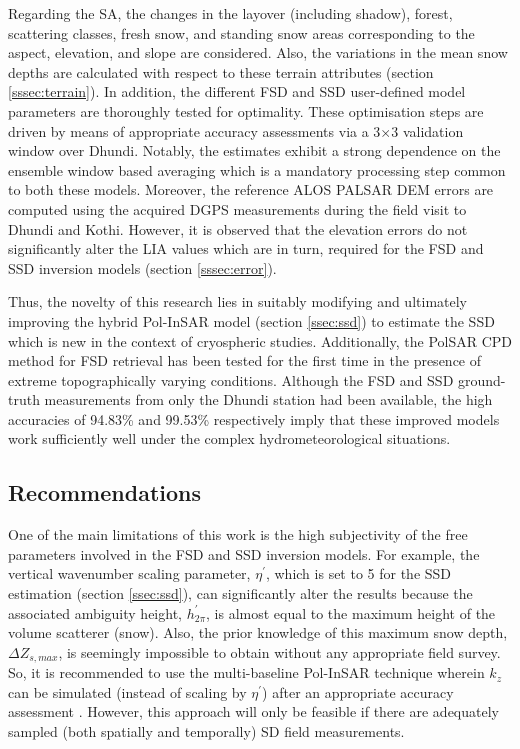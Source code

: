 \documentclass[review]{elsarticle}
\numberwithin{equation}{section}
\numberwithin{figure}{section}
\numberwithin{table}{section}
\begin{document}
Regarding the SA, the changes in the layover (including shadow), forest, scattering classes, fresh snow, and standing snow areas corresponding to the aspect, elevation, and slope are considered. Also, the variations in the mean snow depths are calculated with respect to these terrain attributes (section \ref{sssec:terrain}). In addition, the different FSD and SSD user-defined model parameters are thoroughly tested for optimality. These optimisation steps are driven by means of appropriate accuracy assessments via a 3$\times$3 validation window over Dhundi. Notably, the estimates exhibit a strong dependence on the ensemble window based averaging which is a mandatory processing step common to both these models. Moreover, the reference ALOS PALSAR DEM errors are computed using the acquired DGPS measurements during the field visit to Dhundi and Kothi. However, it is observed that the elevation errors do not significantly alter the LIA values which are in turn, required for the FSD and SSD inversion models (section \ref{sssec:error}).

Thus, the novelty of this research lies in suitably modifying and ultimately improving the hybrid Pol-InSAR model (section \ref{ssec:ssd}) to estimate the SSD which is new in the context of cryospheric studies. Additionally, the PolSAR CPD method for FSD retrieval has been tested for the first time in the presence of extreme topographically varying conditions. Although the FSD and SSD ground-truth measurements from only the Dhundi station had been available, the high accuracies of 94.83\% and 99.53\% respectively imply that these improved models work sufficiently well under the complex hydrometeorological situations.

\subsection{Recommendations}

One of the main limitations of this work is the high subjectivity of the free parameters involved in the FSD and SSD inversion models. For example, the vertical wavenumber scaling parameter, $\eta^\prime$, which is set to 5 for the SSD estimation (section \ref{ssec:ssd}), can significantly alter the results because the associated ambiguity height, $h_{2\pi}^\prime$, is almost equal to the maximum height of the volume scatterer (snow). Also, the prior knowledge of this maximum snow depth, $\Delta{Z_{s, max}}$, is seemingly impossible to obtain without any appropriate field survey. So, it is recommended to use the multi-baseline Pol-InSAR technique \citep{Cloude2010} wherein $k_z$ can be simulated (instead of scaling by $\eta^\prime$) after an appropriate accuracy assessment \citep{Kumar2017}. However, this approach will only be feasible if there are adequately sampled (both spatially and temporally) SD field measurements.
\end{document}
